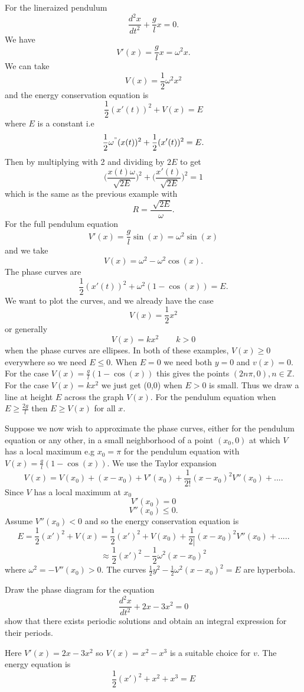\begin{example}
For the lineraized pendulum $$\frac{d^2x}{dt^2}+\frac{g}{l}x=0.$$ We have $$V'(x)=\frac{g}{l}x = \omega^2x.$$ We can take $$V(x) = \frac{1}{2}\omega^2x^2$$ and the energy conservation equation is $$\frac{1}{2}(x'(t))^2+V(x) = E$$ where $E$ is a constant i.e $$\frac{1}{2}\omega ^"(x(t))^2+\frac{1}{2}(x'(t))^2 = E.$$ Then by multiplying with 2 and dividing by $2E$ to get $$\bigg(\frac{x(t)\omega}{\sqrt[]{2E}}\bigg)^2+\bigg(\frac{x'(t)}{\sqrt[]{2E}}\bigg)^2 = 1$$ which is the same as the previous example with $$R =\frac{\sqrt[]{2E}}{\omega}.$$ For the full pendulum equation $$V'(x) = \frac{g}{l}\sin(x) = \omega^2\sin(x)$$ and we take $$V(x) = \omega^2 - \omega^2 \cos(x).$$ The phase curves are $$\frac{1}{2}(x'(t))^2+\omega^2(1-\cos(x))=E.$$
 We want to plot the curves, and we already have the case $$V(x) = \frac{1}{2}x^2$$ or generally $$V(x) = kx^2 \hspace{25pt} k>0$$ when the phase curves are ellipses. In both of these examples, $V(x)  \geq 0$ everywhere so we need $E\leq 0$. When $E=0$ we need both $y=0$ and $v(x) = 0$. For the case $V(x) = \frac{g}{l}(1-\cos(x))$ this gives the points $(2n\pi,0), n\in \mathbb{Z}.$ For the case $V(x) = kx^2$ we just get (0,0) when $E>0$ is small. Thus we draw a line at height $E$ across the graph $V(x).$ 
 \smallskip
 For the pendulum equation when $E\geq \frac{2g}{l}$ then $E\geq V(x)$ for all $x$. 
 
 \bigskip 
 
 Suppose we now wish to approximate the phase curves, either for the pendulum equation or any other, in a small neighborhood of a point $(x_0,0)$ at which $V$ has a local maximum e.g $x_0 = \pi$ for the pendulum equation with $V(x) = \frac{g}{l}(1-\cos(x))$. We use the Taylor expansion $$V(x) = V(x_0) +(x-x_0)+V'(x_0)+\frac{1}{2!}(x-x_0)^2V''(x_0)+....$$ Since $V$ has a local maximum at $x_0$ $$V'(x_0) = 0$$ $$V''(x_0) \leq 0.$$ Assume $V''(x_0) <0$ and so the energy conservation equation is $$E=\frac{1}{2}(x')^2+V(x) = \frac{1}{2}(x')^2+V(x_0) + \frac{1}{2|}(x-x_0)^2V''(x_0) +.....$$ $$\approx \frac{1}{2}(x')^2-\frac{1}{2}\omega^2(x-x_0)^2$$ where $\omega^2 = -V''(x_0)>0.$ The curves $\frac{1}{2}y^2-\frac{1}{2}\omega^2(x-x_0)^2 = E$ are hyperbola.
\end{example}
\begin{example}
Draw the phase diagram for the equation $$\frac{d^2x}{dt^2}+2x-3x^2 = 0$$ show that there exists periodic solutions and obtain an integral expression for their periods.
\begin{solution}
Here $V'(x) = 2x-3x^2$ so $V(x) = x^2-x^3$ is a suitable choice for $v$. The energy equation is $$\frac{1}{2}(x')^2+x^2+x^3 = E$$ 
\end{solution}
\end{example}
